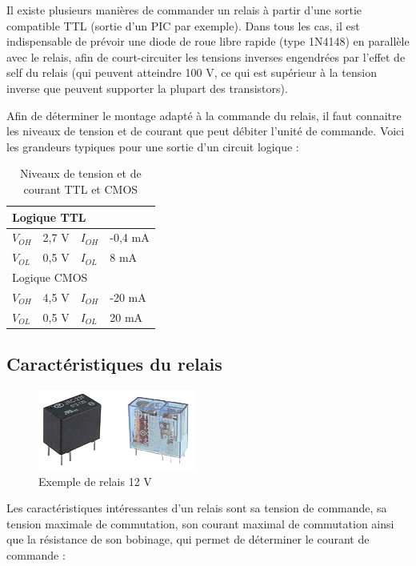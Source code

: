 \documentclass[a4paper]{article}
\begin{document}
Il existe plusieurs manières de commander un relais à partir d'une sortie compatible \ac{TTL} (sortie d'un PIC par exemple). Dans tous les cas, il est indispensable de prévoir une diode de roue libre rapide (type 1N4148) en parallèle avec le relais, afin de court-circuiter les tensions inverses engendrées par l'effet de self du relais (qui peuvent atteindre 100 V, ce qui est supérieur à la tension inverse que peuvent supporter la plupart des transistors).

Afin de déterminer le montage adapté à la commande du relais, il faut connaitre les niveaux de tension et de courant que peut débiter l'unité de commande. Voici les grandeurs typiques pour une sortie d'un circuit logique :

\begin{table}[H]
	\centering
	\begin{tabular}{|l|l||l|l|}\hline
			\multicolumn{4}{|l|}{Logique \ac{TTL}}\\\hline
			$V_{OH}$ & 2,7 V & $I_{OH}$ & -0,4 mA\\\hline
			$V_{OL}$ & 0,5 V & $I_{OL}$ & 8 mA\\\hline\hline
			\multicolumn{4}{|l|}{Logique \ac{CMOS}}\\\hline
			$V_{OH}$ & 4,5 V & $I_{OH}$ & -20 mA\\\hline
			$V_{OL}$ & 0,5 V & $I_{OL}$ & 20 mA\\\hline
	\end{tabular}
	\caption{Niveaux de tension et de courant \ac{TTL} et \ac{CMOS}
		\label{Niveaux_de_tension_et_de_courant_TTL_et_CMOS}}
\end{table}

\subsection{Caractéristiques du relais}

\begin{figure}[H]
	\centering
	\includegraphics[scale=0.75]{Images/Relais.png}
	\caption{Exemple de relais 12 V
		\label{Relais}}
\end{figure}

Les caractéristiques intéressantes d'un relais sont sa tension de commande, sa tension maximale de commutation, son courant maximal de commutation ainsi que la résistance de son bobinage, qui permet de déterminer le courant \og{}de commande\fg{} :
\end{document}
